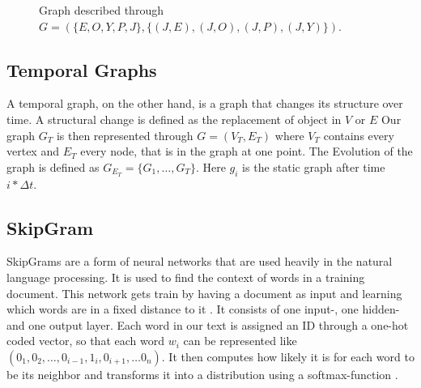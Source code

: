 \documentclass[sigconf]{acmart}
\begin{document}
 \begin{figure}[h]
  \begin{center}
\end{center}
\caption{Graph described through \\ \( G = (\{E,O,Y,P,J\}, \{(J,E),(J,O), (J,P), (J,Y)\}) \).}
\end{figure}

\subsection{Temporal Graphs}
A temporal graph, on the other hand, is a graph that changes its structure over time. A structural change is defined as the replacement of object in \(V\) or \(E\)  %
Our graph \(G_T\) is then represented through \(G = (V_T,E_T)\) where \(V_T\) contains every vertex and \(E_T\) every node, that is in the graph at one point.
The Evolution of the graph is defined as \(G_{E_T} = \{G_1, \ldots, G_T\}\). Here \(g_i\) is the static graph after time \(i*\Delta t\).
\cite{DBLP:journals/corr/abs-1905-05304}

\subsection{SkipGram}
SkipGrams are a form of neural networks that are used heavily in the natural language processing. It is used to find the context of words in a training document.
This network gets train by having a document as input and learning which words are in a fixed distance to it \cite{Rong.11.11.2014}.
It consists of one input-, one hidden- and one output layer. 
Each word in our text is assigned an ID through a one-hot coded vector, so that each word \(w_i\) can be represented like \((0_1, 0_2, \ldots, 0_{i-1}, 1_i, 0_{i+1}, \ldots 0_n)\).
It then computes how likely it is for each word to be its neighbor and transforms it into a distribution using a softmax-function \cite{gao2018properties}.
\end{document}
